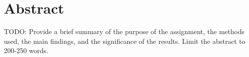\section{Abstract}

TODO: Provide a brief summary of the purpose of the assignment, the methods used, the main findings, and the significance of the results. Limit the abstract to 200-250 words.